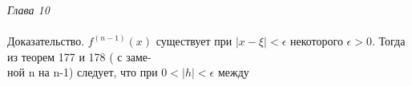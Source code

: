 \footnotesize
\pagenumbering{\itarabic}
\textit{Глава 10}\\
\linespread{1}\\
Доказательство. \begin{math}f^{(n-1)}(x)\end{math} существует при \begin{math}|x-\xi|<\epsilon\end{math}
 некоторого \begin{math}\epsilon>0\end{math}. Тогда из теорем 177 и 178 ( с заме-
\\ной n на n-1) следует, что при \begin{math}0<|h|<\epsilon\end{math} между \begin{math}\end{math}